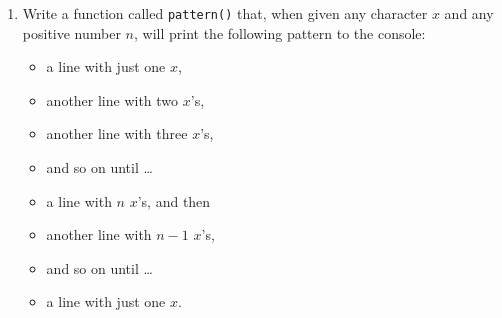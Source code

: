 \documentclass[]{book}
\makeatletter
\newenvironment{Shaded}{\begin{snugshade}}{\end{snugshade}}
\newcommand{\KeywordTok}[1]{\textcolor[rgb]{0.13,0.29,0.53}{\textbf{{#1}}}}
\newcommand{\DecValTok}[1]{\textcolor[rgb]{0.00,0.00,0.81}{{#1}}}
\newcommand{\FloatTok}[1]{\textcolor[rgb]{0.00,0.00,0.81}{{#1}}}
\newcommand{\StringTok}[1]{\textcolor[rgb]{0.31,0.60,0.02}{{#1}}}
\newcommand{\NormalTok}[1]{{#1}}
\providecommand{\tightlist}{%
  \setlength{\itemsep}{0pt}\setlength{\parskip}{0pt}}
\newenvironment{kframe}{%
\medskip{}
\setlength{\fboxsep}{.8em}
 \def\at@end@of@kframe{}%
 \ifinner\ifhmode%
  \def\at@end@of@kframe{\end{minipage}}%
  \begin{minipage}{\columnwidth}%
 \fi\fi%
 \def\FrameCommand##1{\hskip\@totalleftmargin \hskip-\fboxsep
 \colorbox{shadecolor}{##1}\hskip-\fboxsep
     \hskip-\linewidth \hskip-\@totalleftmargin \hskip\columnwidth}%
 \MakeFramed {\advance\hsize-\width
   \@totalleftmargin\z@ \linewidth\hsize
   \@setminipage}}%
 {\par\unskip\endMakeFramed%
 \at@end@of@kframe}
\renewenvironment{Shaded}{\begin{kframe}}{\end{kframe}}
\theoremstyle{definition}
\theoremstyle{definition}
\theoremstyle{remark}
\makeatother
\begin{document}
{\begin{enumerate}
  \begin{itemize}
  \tightlist
  \item
    the absolute value of 3 is 3;
  \item
    the absolute value of -3 is -(-3), which is 3;
  \item
    the absolute value of -5.7 is -(-5.7), which is 5.7
  \item
    the absolute value of 0 is 0.
  \end{itemize}

  The absolute value is important enough that R provides the
  \texttt{abs()} function to
  compute it. Thus:

\begin{Shaded}
\begin{Highlighting}[]
\KeywordTok{abs}\NormalTok{(-}\FloatTok{3.7}\NormalTok{)}
\end{Highlighting}
\end{Shaded}

\begin{verbatim}
## [1] 3.7
\end{verbatim}

  Write a function called \texttt{absolute()} that computes the absolute
  value of any given number \texttt{x}. Your code should make no
  reference to R's \texttt{abs()}.

  \textbf{Small Bonus}: Write the function so that it follows the
  vector-in, vector-out principle, that is: when it is given a vector of
  numbers it returns the vector of their absolute values, like this:

\begin{Shaded}
\begin{Highlighting}[]
\NormalTok{vec <-}\StringTok{ }\KeywordTok{c}\NormalTok{(-}\DecValTok{3}\NormalTok{, }\DecValTok{5}\NormalTok{, -}\FloatTok{2.7}\NormalTok{)}
\KeywordTok{absolute}\NormalTok{(vec)}
\end{Highlighting}
\end{Shaded}

\begin{verbatim}
## [1] 3.0 5.0 2.7
\end{verbatim}
\item
  Write a function called \texttt{pattern()} that, when given any
  character \(x\) and any positive number \(n\), will print the
  following pattern to the console:

  \begin{itemize}
  \tightlist
  \item
    a line with just one \(x\),
  \item
    another line with two \(x\)'s,
  \item
    another line with three \(x\)'s,
  \item
    and so on until \ldots{}
  \item
    a line with \(n\) \(x\)'s, and then
  \item
    another line with \(n-1\) \(x\)'s,
  \item
    and so on until \ldots{}
  \item
    a line with just one \(x\).
  \end{itemize}


\end{enumerate}}
\end{document}
